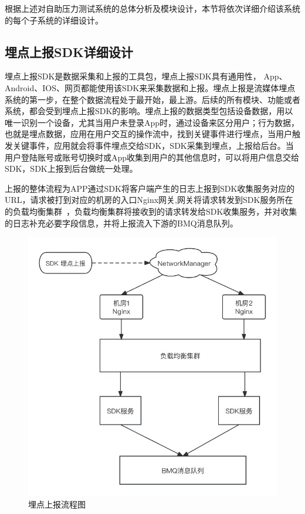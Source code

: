 根据上述对自助压力测试系统的总体分析及模块设计，本节将依次详细介绍该系统的每个子系统的详细设计。

\subsection{埋点上报SDK详细设计}
埋点上报SDK是数据采集和上报的工具包，埋点上报SDK具有通用性， App、Android、IOS、网页都能使用该SDK来采集数据和上报。埋点上报是流媒体埋点系统的第一步，在整个数据流程处于最开始，最上游。后续的所有模块、功能或者系统，都会受到埋点上报SDK的影响。埋点上报的数据类型包括设备数据，用以唯一识别一个设备，尤其当用户未登录App时，通过设备来区分用户；行为数据，也就是埋点数据，应用在用户交互的操作流中，找到关键事件进行埋点，当用户触发关键事件，应用就会将事件埋点交给SDK，SDK采集到埋点，上报给后台。当用户登陆账号或账号切换时或App收集到用户的其他信息时，可以将用户信息交给SDK，SDK上报到后台做统一处理。

上报的整体流程为APP通过SDK将客户端产生的日志上报到SDK收集服务对应的URL，请求被打到对应的机房的入口Nginx网关,网关将请求转发到SDK服务所在的负载均衡集群~\cite{ghomi2017load}，负载均衡集群将接收到的请求转发给SDK收集服务，并对收集的日志补充必要字段信息，并将上报流入下游的BMQ消息队列。
 \begin{figure}[htb]
  \centering
  \includegraphics[width=5in]{figure/chapter4/埋点上报流程图.jpg}
  \caption{埋点上报流程图}\label{maidanliucheng}
\end{figure}

